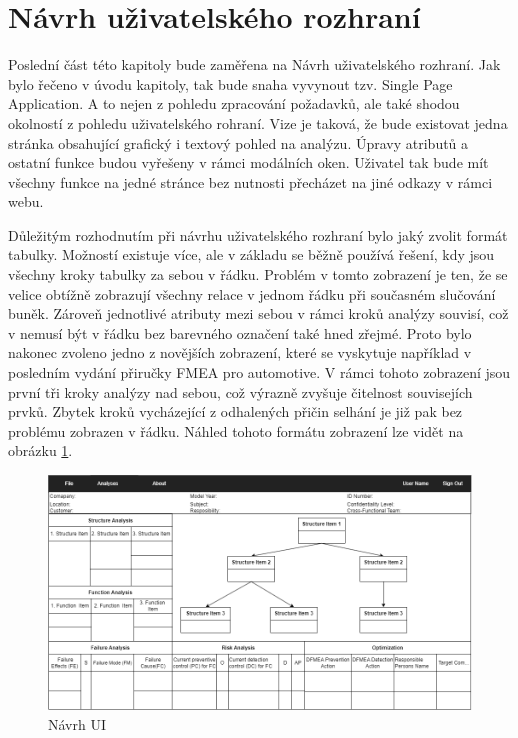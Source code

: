 \section{Návrh uživatelského rozhraní}
Poslední část této kapitoly bude zaměřena na Návrh uživatelského rozhraní. Jak bylo řečeno v úvodu kapitoly, tak bude snaha vyvynout tzv. Single Page Application. A to nejen z pohledu zpracování požadavků, ale také shodou okolností z pohledu uživatelského rohraní. Vize je taková, že bude existovat jedna stránka obsahující grafický i textový pohled na analýzu. Úpravy atributů a ostatní funkce budou vyřešeny v rámci modálních oken. Uživatel tak bude mít všechny funkce na jedné stránce bez nutnosti přecházet na jiné odkazy v rámci webu. 

Důležitým rozhodnutím při návrhu uživatelského rozhraní bylo jaký zvolit formát tabulky. Možností existuje více, ale v základu se běžně používá řešení, kdy jsou všechny kroky tabulky za sebou v řádku. Problém v tomto zobrazení je ten, že se velice obtížně zobrazují všechny relace v jednom řádku při současném slučování buněk. Zároveň jednotlivé atributy mezi sebou v rámci kroků analýzy souvisí, což v nemusí být v řádku bez barevného označení také hned zřejmé. Proto bylo nakonec zvoleno jedno z novějších zobrazení, které se vyskytuje například v posledním vydání přiručky FMEA pro automotive.\cite{handbookExample} V rámci tohoto zobrazení jsou první tři kroky analýzy nad sebou, což výrazně zvyšuje čitelnost souvisejích prvků. Zbytek kroků vycházející z odhalených přičin selhání je již pak bez problému zobrazen v řádku. Náhled tohoto formátu zobrazení lze vidět na obrázku \ref{fig:ui}.

\begin{figure}[h]
\centering
	\includegraphics[width=1.0\textwidth]{Figures/mockup3.png}
	\caption{Návrh UI }
	\label{fig:ui}
\end{figure}